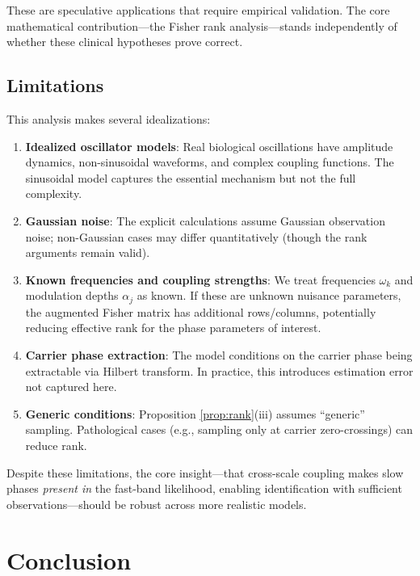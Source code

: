 \documentclass[12pt]{article}
\begin{document}
These are speculative applications that require empirical validation. The core mathematical contribution---the Fisher rank analysis---stands independently of whether these clinical hypotheses prove correct.

\subsection{Limitations}

This analysis makes several idealizations:
\begin{enumerate}
    \item \textbf{Idealized oscillator models}: Real biological oscillations have amplitude dynamics, non-sinusoidal waveforms, and complex coupling functions. The sinusoidal model captures the essential mechanism but not the full complexity.

    \item \textbf{Gaussian noise}: The explicit calculations assume Gaussian observation noise; non-Gaussian cases may differ quantitatively (though the rank arguments remain valid).

    \item \textbf{Known frequencies and coupling strengths}: We treat frequencies $\omega_k$ and modulation depths $\alpha_j$ as known. If these are unknown nuisance parameters, the augmented Fisher matrix has additional rows/columns, potentially reducing effective rank for the phase parameters of interest.

    \item \textbf{Carrier phase extraction}: The model conditions on the carrier phase being extractable via Hilbert transform. In practice, this introduces estimation error not captured here.

    \item \textbf{Generic conditions}: Proposition \ref{prop:rank}(iii) assumes ``generic'' sampling. Pathological cases (e.g., sampling only at carrier zero-crossings) can reduce rank.
\end{enumerate}

Despite these limitations, the core insight---that cross-scale coupling makes slow phases \emph{present in} the fast-band likelihood, enabling identification with sufficient observations---should be robust across more realistic models.

\section{Conclusion}
\end{document}
